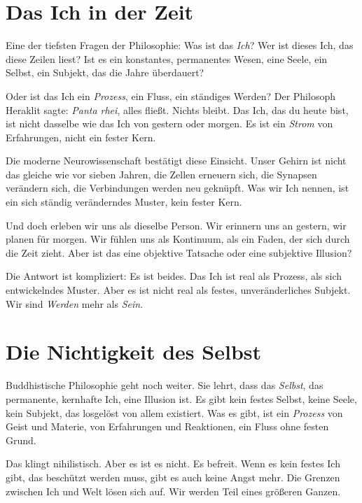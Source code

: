 \section{Das Ich in der Zeit}

Eine der tiefsten Fragen der Philosophie: Was ist das \emph{Ich}? Wer ist dieses \glqq Ich\grqq{}, das diese Zeilen liest? Ist es ein konstantes, permanentes Wesen, eine Seele, ein Selbst, ein Subjekt, das die Jahre überdauert?

Oder ist das Ich ein \emph{Prozess}, ein Fluss, ein ständiges Werden? Der Philosoph Heraklit \cite{Heraklit500} sagte: \emph{\glqq Panta rhei\grqq{}}, alles fließt. Nichts bleibt. Das Ich, das du heute bist, ist nicht dasselbe wie das Ich von gestern oder morgen. Es ist ein \emph{Strom} von Erfahrungen, nicht ein fester Kern.

Die moderne Neurowissenschaft bestätigt diese Einsicht. Unser Gehirn ist nicht das gleiche wie vor sieben Jahren, die Zellen erneuern sich, die Synapsen verändern sich, die Verbindungen werden neu geknüpft. Was wir \glqq Ich\grqq{} nennen, ist ein sich ständig veränderndes Muster, kein fester Kern.

Und doch erleben wir uns als dieselbe Person. Wir erinnern uns an gestern, wir planen für morgen. Wir fühlen uns als Kontinuum, als ein Faden, der sich durch die Zeit zieht. Aber ist das eine objektive Tatsache oder eine subjektive Illusion?

Die Antwort ist kompliziert: Es ist beides. Das Ich ist real als Prozess, als sich entwickelndes Muster. Aber es ist nicht real als festes, unveränderliches Subjekt. Wir sind \emph{Werden} mehr als \emph{Sein}.

\section{Die Nichtigkeit des Selbst}

Buddhistische Philosophie geht noch weiter. Sie lehrt, dass das \emph{Selbst}, das permanente, kernhafte Ich, eine Illusion ist. Es gibt kein festes Selbst, keine Seele, kein Subjekt, das losgelöst von allem existiert. Was es gibt, ist ein \emph{Prozess} von Geist und Materie, von Erfahrungen und Reaktionen, ein Fluss ohne festen Grund.

Das klingt nihilistisch. Aber es ist es nicht. Es befreit. Wenn es kein festes Ich gibt, das beschützt werden muss, gibt es auch keine Angst mehr. Die Grenzen zwischen Ich und Welt lösen sich auf. Wir werden Teil eines größeren Ganzen.

